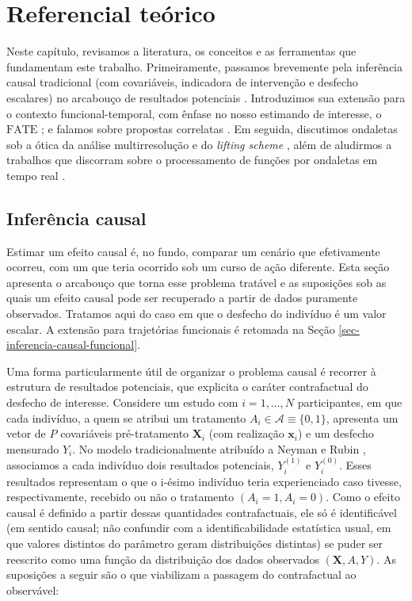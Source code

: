  \chapter[Referencial teórico]{Referencial teórico}\label{sec-revisao}

Neste capítulo, revisamos a literatura, os conceitos e as ferramentas que fundamentam este trabalho.
Primeiramente, passamos brevemente pela inferência causal tradicional (com covariáveis, indicadora de intervenção e desfecho escalares) no arcabouço de resultados potenciais \cite{rubin_estimating_1974, holland_statistics_1986}.
Introduzimos sua extensão para o contexto funcional-temporal, com ênfase no nosso estimando de interesse, o \(\mathrm{FATE}\) \cite{ecker_causal_2024}; e falamos sobre propostas correlatas \cite{testa_doubly-robust_2025, sparkes_functional_2024}.
Em seguida, discutimos ondaletas sob a ótica da análise multirresolução \cite{mallat_theory_1989, vidakovic_statistical_1999} e do \emph{lifting scheme} \cite{sweldens_lifting_1995}, além de aludirmos a trabalhos que discorram sobre o processamento de funções por ondaletas em tempo real \cite{liu_improved_2014}.

\section{Inferência causal}\label{sec-inferencia-causal}

Estimar um efeito causal é, no fundo, comparar um cenário que efetivamente ocorreu, com um que teria ocorrido sob um curso de ação diferente.
Esta seção apresenta o arcabouço que torna esse problema tratável e as suposições sob as quais um efeito causal pode ser recuperado a partir de dados puramente observados.
Tratamos aqui do caso em que o desfecho do indivíduo é um valor escalar. A extensão para trajetórias funcionais é retomada na Seção \ref{sec-inferencia-causal-funcional}.

Uma forma particularmente útil de organizar o problema causal é recorrer à estrutura de resultados potenciais, que explicita o caráter contrafactual do desfecho de interesse. 
Considere um estudo com \(i = 1, \dots, N\) participantes, em que cada indivíduo, a quem se atribui um tratamento \(A_i \in \mathcal{A} \equiv \{0, 1\}\), apresenta um vetor de \(P\) covariáveis pré-tratamento \(\mathbf{X}_i\) (com realização \(\mathbf{x}_i\)) e um desfecho mensurado \(Y_i\). 
No modelo tradicionalmente atribuído a Neyman e Rubin \cite{rubin_estimating_1974, holland_statistics_1986}, associamos a cada indivíduo dois resultados potenciais, \(Y_i^{(1)}\) e \(Y_i^{(0)}\). 
Esses resultados representam o que o i-ésimo indivíduo teria experienciado caso tivesse, respectivamente, recebido ou não o tratamento \((A_i = 1, A_i = 0)\). 
Como o efeito causal é definido a partir dessas quantidades contrafactuais, ele só é identificável (em sentido causal; não confundir com a identificabilidade estatística usual, em que valores distintos do parâmetro geram distribuições distintas) se puder ser reescrito como uma função da distribuição dos dados observados \((\mathbf{X}, A, Y)\). 
As suposições a seguir são o que viabilizam a passagem do contrafactual ao observável:

